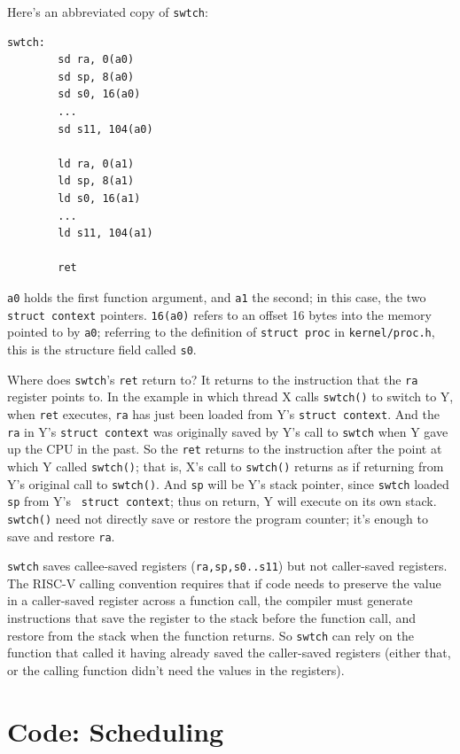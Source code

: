 Here's an abbreviated copy of {\tt swtch}:

\begin{verbatim}
swtch:
        sd ra, 0(a0)
        sd sp, 8(a0)
        sd s0, 16(a0)
        ...
        sd s11, 104(a0)

        ld ra, 0(a1)
        ld sp, 8(a1)
        ld s0, 16(a1)
        ...
        ld s11, 104(a1)
        
        ret
\end{verbatim}

{\tt a0} holds the first function argument, and {\tt a1} the second;
in this case, the two {\tt struct context} pointers.
{\tt 16(a0)} refers to an offset 16 bytes into the memory
pointed to by {\tt a0}; referring
to the definition of {\tt struct proc} in {\tt kernel/proc.h},
this is the structure field called {\tt s0}.

Where does {\tt swtch}'s {\tt ret} return to? It returns to the
instruction that the {\tt ra} register points to. In the example in
which thread X calls {\tt swtch()} to switch to Y, when {\tt ret}
executes, {\tt ra} has just been loaded from Y's {\tt struct context}.
And the {\tt ra} in Y's {\tt struct context} was originally saved by
Y's call to {\tt swtch} when Y gave up the CPU in the past. So the
{\tt ret} returns to the instruction after the point at which Y called
{\tt swtch()}; that is, X's call to {\tt swtch()} returns as if
returning from Y's original call to {\tt swtch()}. And {\tt sp} will
be Y's stack pointer, since {\tt swtch} loaded {\tt sp} from Y's {\tt
  struct context}; thus on return, Y will execute on its own stack.
{\tt swtch()} need not directly save or restore the program counter;
it's enough to save and restore {\tt ra}.

\lstinline{swtch}
saves callee-saved registers ({\tt ra,sp,s0..s11}) but not caller-saved registers.
The RISC-V calling convention requires that if code needs to
preserve the value in a caller-saved register across a function
call, the compiler must generate instructions
that save the register to the stack before the function call,
and restore from the stack when the
function returns. So \lstinline{swtch} can rely on the function that
called it having already saved the caller-saved registers (either
that, or the calling function didn't need the values in the
registers).

\section{Code: Scheduling}

